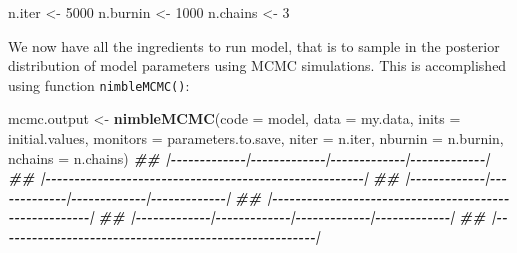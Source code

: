 \documentclass[
  12pt,
]{krantz}
\newenvironment{Shaded}{\begin{snugshade}}{\end{snugshade}}
\newcommand{\AttributeTok}[1]{\textcolor[rgb]{0.13,0.29,0.53}{#1}}
\newcommand{\DecValTok}[1]{\textcolor[rgb]{0.00,0.00,0.81}{#1}}
\newcommand{\DocumentationTok}[1]{\textcolor[rgb]{0.56,0.35,0.01}{\textbf{\textit{#1}}}}
\newcommand{\FunctionTok}[1]{\textcolor[rgb]{0.13,0.29,0.53}{\textbf{#1}}}
\newcommand{\NormalTok}[1]{#1}
\newcommand{\OtherTok}[1]{\textcolor[rgb]{0.56,0.35,0.01}{#1}}
\begin{document}
\begin{Shaded}
\begin{Highlighting}[]
\NormalTok{n.iter }\OtherTok{\textless{}{-}} \DecValTok{5000}
\NormalTok{n.burnin }\OtherTok{\textless{}{-}} \DecValTok{1000}
\NormalTok{n.chains }\OtherTok{\textless{}{-}} \DecValTok{3}
\end{Highlighting}
\end{Shaded}

We now have all the ingredients to run model, that is to sample in the posterior distribution of model parameters using MCMC simulations. This is accomplished using function \texttt{nimbleMCMC()}:

\begin{Shaded}
\begin{Highlighting}[]
\NormalTok{mcmc.output }\OtherTok{\textless{}{-}} \FunctionTok{nimbleMCMC}\NormalTok{(}\AttributeTok{code =}\NormalTok{ model,}
                          \AttributeTok{data =}\NormalTok{ my.data,}
                          \AttributeTok{inits =}\NormalTok{ initial.values,}
                          \AttributeTok{monitors =}\NormalTok{ parameters.to.save,}
                          \AttributeTok{niter =}\NormalTok{ n.iter,}
                          \AttributeTok{nburnin =}\NormalTok{ n.burnin,}
                          \AttributeTok{nchains =}\NormalTok{ n.chains)}
\DocumentationTok{\#\# |{-}{-}{-}{-}{-}{-}{-}{-}{-}{-}{-}{-}{-}|{-}{-}{-}{-}{-}{-}{-}{-}{-}{-}{-}{-}{-}|{-}{-}{-}{-}{-}{-}{-}{-}{-}{-}{-}{-}{-}|{-}{-}{-}{-}{-}{-}{-}{-}{-}{-}{-}{-}{-}|}
\DocumentationTok{\#\# |{-}{-}{-}{-}{-}{-}{-}{-}{-}{-}{-}{-}{-}{-}{-}{-}{-}{-}{-}{-}{-}{-}{-}{-}{-}{-}{-}{-}{-}{-}{-}{-}{-}{-}{-}{-}{-}{-}{-}{-}{-}{-}{-}{-}{-}{-}{-}{-}{-}{-}{-}{-}{-}{-}{-}|}
\DocumentationTok{\#\# |{-}{-}{-}{-}{-}{-}{-}{-}{-}{-}{-}{-}{-}|{-}{-}{-}{-}{-}{-}{-}{-}{-}{-}{-}{-}{-}|{-}{-}{-}{-}{-}{-}{-}{-}{-}{-}{-}{-}{-}|{-}{-}{-}{-}{-}{-}{-}{-}{-}{-}{-}{-}{-}|}
\DocumentationTok{\#\# |{-}{-}{-}{-}{-}{-}{-}{-}{-}{-}{-}{-}{-}{-}{-}{-}{-}{-}{-}{-}{-}{-}{-}{-}{-}{-}{-}{-}{-}{-}{-}{-}{-}{-}{-}{-}{-}{-}{-}{-}{-}{-}{-}{-}{-}{-}{-}{-}{-}{-}{-}{-}{-}{-}{-}|}
\DocumentationTok{\#\# |{-}{-}{-}{-}{-}{-}{-}{-}{-}{-}{-}{-}{-}|{-}{-}{-}{-}{-}{-}{-}{-}{-}{-}{-}{-}{-}|{-}{-}{-}{-}{-}{-}{-}{-}{-}{-}{-}{-}{-}|{-}{-}{-}{-}{-}{-}{-}{-}{-}{-}{-}{-}{-}|}
\DocumentationTok{\#\# |{-}{-}{-}{-}{-}{-}{-}{-}{-}{-}{-}{-}{-}{-}{-}{-}{-}{-}{-}{-}{-}{-}{-}{-}{-}{-}{-}{-}{-}{-}{-}{-}{-}{-}{-}{-}{-}{-}{-}{-}{-}{-}{-}{-}{-}{-}{-}{-}{-}{-}{-}{-}{-}{-}{-}|}
\end{Highlighting}
\end{Shaded}
\end{document}

